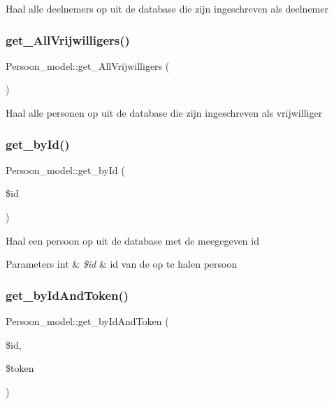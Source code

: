 Haal alle deelnemers op uit de database die zijn ingeschreven als deelnemer \mbox{\label{class_persoon__model_a3ec3c4838d03ea025746333367305dfc}} 
\subsubsection{\texorpdfstring{get\+\_\+\+All\+Vrijwilligers()}{get\_AllVrijwilligers()}}
{\footnotesize\ttfamily Persoon\+\_\+model\+::get\+\_\+\+All\+Vrijwilligers (\begin{DoxyParamCaption}{ }\end{DoxyParamCaption})}

Haal alle personen op uit de database die zijn ingeschreven als vrijwilliger \mbox{\label{class_persoon__model_a0b88e4e63e880d5c6a5c18a12ac21272}} 
\subsubsection{\texorpdfstring{get\+\_\+by\+Id()}{get\_byId()}}
{\footnotesize\ttfamily Persoon\+\_\+model\+::get\+\_\+by\+Id (\begin{DoxyParamCaption}\item[{}]{\$id }\end{DoxyParamCaption})}

Haal een persoon op uit de database met de meegegeven id 
\begin{DoxyParams}[1]{Parameters}
int & {\em \$id} & id van de op te halen persoon \\
\hline
\end{DoxyParams}
\mbox{\label{class_persoon__model_af6238e2ada132ef41f5ab612f027c879}} 
\subsubsection{\texorpdfstring{get\+\_\+by\+Id\+And\+Token()}{get\_byIdAndToken()}}
{\footnotesize\ttfamily Persoon\+\_\+model\+::get\+\_\+by\+Id\+And\+Token (\begin{DoxyParamCaption}\item[{}]{\$id,  }\item[{}]{\$token }\end{DoxyParamCaption})}

